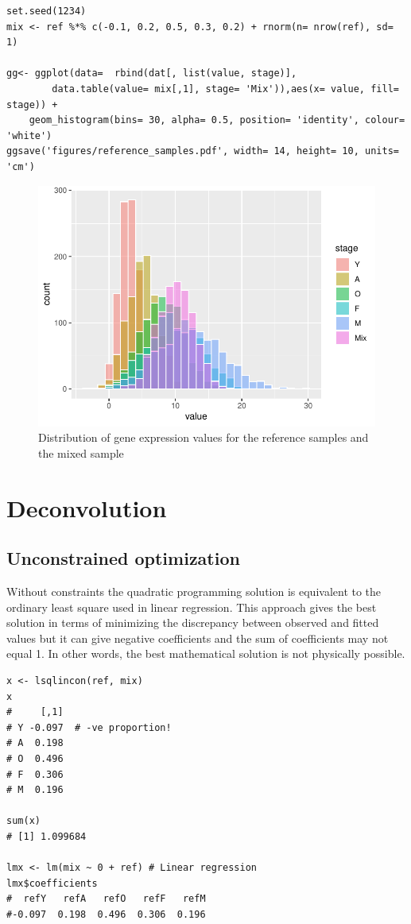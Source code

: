 \documentclass[11pt, fleqn]{article}
\begin{document}
\begin{Verbatim}[formatcom=\color{violet}, fontsize=\small]
set.seed(1234)
mix <- ref %*% c(-0.1, 0.2, 0.5, 0.3, 0.2) + rnorm(n= nrow(ref), sd= 1)

gg<- ggplot(data=  rbind(dat[, list(value, stage)], 
        data.table(value= mix[,1], stage= 'Mix')),aes(x= value, fill= stage)) +
    geom_histogram(bins= 30, alpha= 0.5, position= 'identity', colour= 'white')
ggsave('figures/reference_samples.pdf', width= 14, height= 10, units= 'cm')
\end{Verbatim}

\begin{figure}[H]
    \center
    \includegraphics[height=0.5\textwidth]{figures/reference_samples.pdf}
    \caption{Distribution of gene expression values for the reference samples
    and the mixed sample}
    \label{fig:reference_samples}
\end{figure}

\section{Deconvolution}

\subsection{Unconstrained optimization}

Without constraints the quadratic programming solution is equivalent to the
ordinary least square used in linear regression. This approach gives the best
solution in terms of minimizing the discrepancy between observed and fitted
values but it can give negative coefficients and the sum of coefficients may
not equal 1. In other words, the best mathematical solution is not physically
possible.

\begin{Verbatim}[formatcom=\color{violet}, fontsize=\small]
x <- lsqlincon(ref, mix)
x
#     [,1]
# Y -0.097  # -ve proportion!
# A  0.198
# O  0.496
# F  0.306
# M  0.196

sum(x)
# [1] 1.099684

lmx <- lm(mix ~ 0 + ref) # Linear regression
lmx$coefficients
#  refY   refA   refO   refF   refM 
#-0.097  0.198  0.496  0.306  0.196 

\end{Verbatim}
\end{document}
